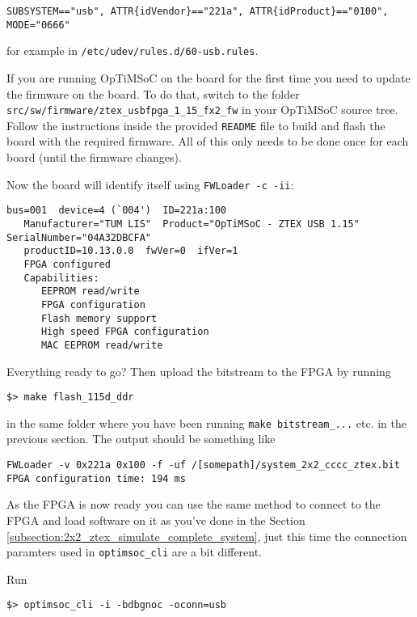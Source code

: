 \begin{lstlisting}
SUBSYSTEM=="usb", ATTR{idVendor}=="221a", ATTR{idProduct}=="0100", MODE="0666"
\end{lstlisting}

for example in \verb|/etc/udev/rules.d/60-usb.rules|.

If you are running OpTiMSoC on the board for the first time you need to update
the firmware on the board. To do that, switch to the folder
\verb|src/sw/firmware/ztex_usbfpga_1_15_fx2_fw| in your OpTiMSoC source tree.
Follow the instructions inside the provided \verb|README| file to build and
flash the board with the required firmware. All of this only needs to be done
once for each board (until the firmware changes).

Now the board will identify itself using \verb|FWLoader -c -ii|:

\begin{lstlisting}
bus=001  device=4 (`004')  ID=221a:100
   Manufacturer="TUM LIS"  Product="OpTiMSoC - ZTEX USB 1.15"    SerialNumber="04A32DBCFA"
   productID=10.13.0.0  fwVer=0  ifVer=1
   FPGA configured
   Capabilities:
      EEPROM read/write
      FPGA configuration
      Flash memory support
      High speed FPGA configuration
      MAC EEPROM read/write
\end{lstlisting}

Everything ready to go? Then upload the bitstream to the FPGA by running

\begin{lstlisting}
$> make flash_115d_ddr
\end{lstlisting}

in the same folder where you have been running \verb|make bitstream_...| etc.
in the previous section. The output should be something like

\begin{lstlisting}
FWLoader -v 0x221a 0x100 -f -uf /[somepath]/system_2x2_cccc_ztex.bit
FPGA configuration time: 194 ms
\end{lstlisting}

As the FPGA is now ready you can use the same method to connect to the
FPGA and load software on it as you've done in the Section
\ref{subsection:2x2_ztex_simulate_complete_system}, just this time the
connection paramters used in \verb|optimsoc_cli| are a bit different.

Run
\begin{lstlisting}
$> optimsoc_cli -i -bdbgnoc -oconn=usb
\end{lstlisting}

